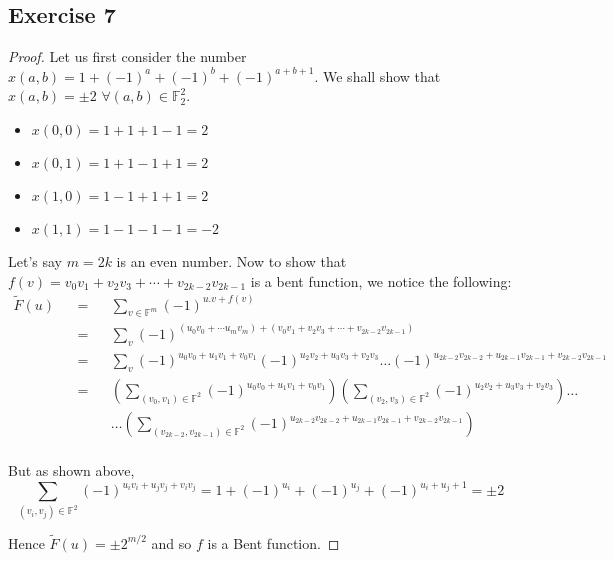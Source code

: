 \documentclass[12pt]{article}
\begin{document}
\subsection*{Exercise 7}
\begin{proof}
Let us first consider the number $x(a,b) = 1 + (-1)^a + (-1)^b + (-1)^{a+b+1}$. We shall show that $x(a,b) = \pm 2$ $\forall (a,b) \in \mathbb{F}_2^2$.
\begin{itemize}
    \item $x(0,0) = 1+1+1-1 = 2$
    \item $x(0,1) = 1+1-1+1 = 2$
    \item $x(1,0) = 1-1+1+1 = 2$
    \item $x(1,1) = 1-1-1-1 = -2$
\end{itemize}

Let's say $m=2k$ is an even number. Now to show that $f(v) = v_0v_1 + v_2v_3 + \cdots + v_{2k-2}v_{2k-1}$ is a bent function, we notice the following:
\begin{align*}
    \tilde{F}(u) &&=&& \sum_{v \in \mathbb{F}^m} (-1)^{u.v+f(v)} \\
    &&=&& \sum_v (-1)^{(u_0v_0 + \cdots u_mv_m) + (v_0v_1 + v_2v_3 + \cdots + v_{2k-2}v_{2k-1})} \\
    &&=&& \sum_v (-1)^{u_0v_0 + u_1v_1 + v_0v_1}(-1)^{u_2v_2 + u_3v_3 + v_2v_3} \ldots (-1)^{u_{2k-2}v_{2k-2} + u_{2k-1}v_{2k-1} + v_{2k-2}v_{2k-1}} \\
    &&=&& \left(\sum_{(v_0, v_1) \in \mathbb{F}^2} (-1)^{u_0v_0 + u_1v_1 + v_0v_1}\right) \left(\sum_{(v_2, v_3) \in \mathbb{F}^2}(-1)^{u_2v_2 + u_3v_3 + v_2v_3}\right) \ldots \\
    &&&& \ldots \left(\sum_{(v_{2k-2}, v_{2k-1}) \in \mathbb{F}^2}(-1)^{u_{2k-2}v_{2k-2} + u_{2k-1}v_{2k-1} + v_{2k-2}v_{2k-1}}\right) \\
\end{align*}

But as shown above, $$\sum_{(v_i, v_j) \in \mathbb{F}^2} (-1)^{u_iv_i + u_jv_j + v_iv_j} = 1 + (-1)^{u_i} + (-1)^{u_j} + (-1)^{u_i+u_j+1} = \pm 2$$

Hence $\tilde{F}(u) = \pm 2^{m/2}$ and so $f$ is a Bent function.
\end{proof}

\vspace{2in} %
\end{document}
